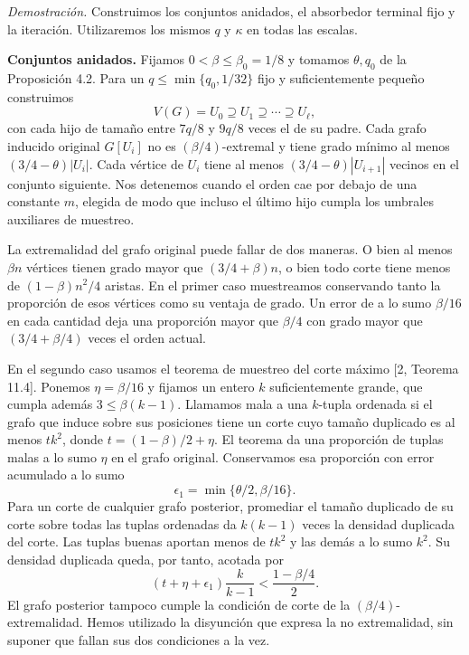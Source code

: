 \documentclass[spanish,11pt,a4paper]{article}
\begin{document}
\emph{Demostración.} Construimos los conjuntos anidados, el absorbedor terminal fijo y la iteración. Utilizaremos los mismos \(q\) y \(\kappa\) en todas las escalas.

\textbf{Conjuntos anidados.} Fijamos \(0<\beta\le\beta_0=1/8\) y tomamos \(\theta,q_0\) de la Proposición 4.2. Para un \(q\le\min\{q_0,1/32\}\) fijo y suficientemente pequeño construimos \[V(G)=U_0\supseteq U_1\supseteq\cdots\supseteq U_\ell,
\tag{A.5}\] con cada hijo de tamaño entre \(7q/8\) y \(9q/8\) veces el de su padre. Cada grafo inducido original \(G[U_i]\) no es \((\beta/4)\)-extremal y tiene grado mínimo al menos \((3/4-\theta)|U_i|\). Cada vértice de \(U_i\) tiene al menos \((3/4-\theta)|U_{i+1}|\) vecinos en el conjunto siguiente. Nos detenemos cuando el orden cae por debajo de una constante \(m\), elegida de modo que incluso el último hijo cumpla los umbrales auxiliares de muestreo.

La extremalidad del grafo original puede fallar de dos maneras. O bien al menos \(\beta n\) vértices tienen grado mayor que \((3/4+\beta)n\), o bien todo corte tiene menos de \((1-\beta)n^2/4\) aristas. En el primer caso muestreamos conservando tanto la proporción de esos vértices como su ventaja de grado. Un error de a lo sumo \(\beta/16\) en cada cantidad deja una proporción mayor que \(\beta/4\) con grado mayor que \((3/4+\beta/4)\) veces el orden actual.

En el segundo caso usamos el teorema de muestreo del corte máximo {[}2, Teorema 11.4{]}. Ponemos \(\eta=\beta/16\) y fijamos un entero \(k\) suficientemente grande, que cumpla además \(3\le\beta(k-1)\). Llamamos mala a una \(k\)-tupla ordenada si el grafo que induce sobre sus posiciones tiene un corte cuyo tamaño duplicado es al menos \(t k^2\), donde \(t=(1-\beta)/2+\eta\). El teorema da una proporción de tuplas malas a lo sumo \(\eta\) en el grafo original. Conservamos esa proporción con error acumulado a lo sumo \[\epsilon_1=\min\{\theta/2,\beta/16\}.\] Para un corte de cualquier grafo posterior, promediar el tamaño duplicado de su corte sobre todas las tuplas ordenadas da \(k(k-1)\) veces la densidad duplicada del corte. Las tuplas buenas aportan menos de \(t k^2\) y las demás a lo sumo \(k^2\). Su densidad duplicada queda, por tanto, acotada por \[(t+\eta+\epsilon_1)\frac{k}{k-1}<\frac{1-\beta/4}{2}.\] El grafo posterior tampoco cumple la condición de corte de la \((\beta/4)\)-extremalidad. Hemos utilizado la disyunción que expresa la no extremalidad, sin suponer que fallan sus dos condiciones a la vez.
\end{document}
